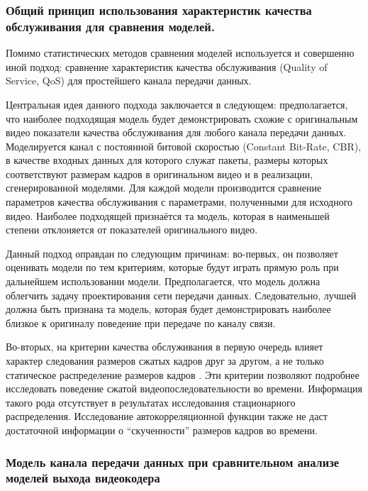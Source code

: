 \subsubsection{Общий принцип использования характеристик
качества обслуживания для сравнения моделей.}

\hspace{3pt}
Помимо статистических методов сравнения моделей используется
\cite{raey}
и совершенно иной подход: сравнение характеристик качества
обслуживания (Quality of Service, QoS) для простейшего
канала передачи данных.

Центральная идея данного подхода заключается в следующем:
предполагается, что наиболее подходящая модель будет демонстрировать
схожие с оригинальным видео показатели качества обслуживания
для любого канала передачи данных. Моделируется канал с постоянной
битовой скоростью (Constant Bit-Rate, CBR), в качестве входных
данных для которого служат пакеты, размеры которых соответствуют
размерам кадров в оригинальном видео и в реализации,
сгенерированной моделями. Для каждой модели производится сравнение
параметров качества обслуживания с параметрами, полученными
для исходного видео. Наиболее подходящей признаётся та модель,
которая в наименьшей степени отклоняется от показателей оригинального
видео.

Данный подход оправдан по следующим причинам: во-первых,
он позволяет оценивать модели по тем критериям, которые
будут играть прямую роль при дальнейшем использовании модели.
Предполагается, что модель должна облегчить задачу проектирования
сети передачи данных. Следовательно, лучшей должна быть признана
та модель, которая будет демонстрировать наиболее близкое
к оригиналу поведение при передаче по каналу связи.

Во-вторых, на критерии качества обслуживания в первую очередь
влияет характер следования размеров сжатых кадров друг за
другом, а не только статическое распределение размеров
кадров \cite{survey2013}.
Эти критерии позволяют подробнее исследовать поведение сжатой
видеопоследовательности во времени. Информация такого
рода отсутствует в результатах исследования стационарного
распределения. Исследование автокорреляционной функции
также не даст достаточной информации о ``скученности'' размеров
кадров во времени.

\subsubsection{Модель канала передачи данных при
сравнительном анализе моделей выхода видеокодера}
\hspace{3pt}

